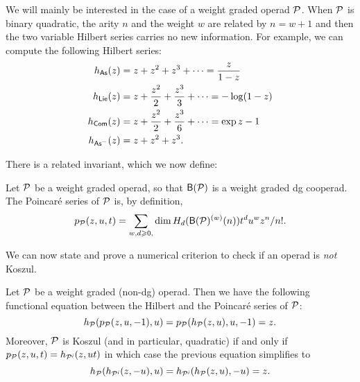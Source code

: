 We will mainly be interested in the case of a weight graded operad ${\mathcal{P}}$.
When ${\mathcal{P}}$ is binary quadratic, the arity $n$ and the weight $w$ are related
by $n = w+1$ and then the two variable Hilbert series carries no new information.
For example, we can compute the following Hilbert series:
\begin{align*}
h_{\mathsf{As}}(z) &=  z + z^2 + z^3 + \cdots = \frac{z}{1-z} \\
h_{\mathsf{Lie}}(z) &=  z + \frac {z^2}2 + \frac{z^3} 3 + \cdots =-\log(1-z) \\
h_{\mathsf{Com}}(z) &=  z + \frac {z^2}2 + \frac{z^3} 6  + \cdots = \exp z -1 \\
h_{\mathsf{As}^-}(z) &=  z +  {z^2} + z^3.
\end{align*}


There is a related invariant, which we now define:
\begin{definition} Let ${\mathcal{P}}$ be a weight graded operad, so that
$\mathsf{B}({\mathcal{P}})$ is a weight graded dg cooperad. The Poincar\'e series
of ${\mathcal{P}}$ is, by definition,
\[
p_{{\mathcal{P}}}(z,u,t) = \sum_{w,d\geqslant 0,} \dim H_d(\mathsf{B}({\mathcal{P}})^{(w)}(n)) t^d u^w z^n/n!.
\]
\end{definition}

We can now state and prove a numerical criterion to check if an
operad is \emph{not} Koszul.

\begin{theorem}
Let ${\mathcal{P}}$ be a weight graded (non-dg) operad. Then we have the following
functional equation between the Hilbert and the Poincar\'e series of ${\mathcal{P}}$:
\[
h_{\mathcal{P}}( p_{\mathcal{P}}(z,u,-1),u) = p_{\mathcal{P}}(h_{\mathcal{P}}(z,u),u,-1) = z. \]
Moreover, ${\mathcal{P}}$ is Koszul (and in particular, quadratic) if and only
if $p_\PP(z,u,t) = h_{\PP^\eantishriek}(z,ut)$ in which case the previous
equation simplifies to
\[
h_\PP( h_{\PP^\eantishriek}(z,-u),u) = h_{\PP^\eantishriek}(h_\PP(z,u),-u) = z. 
\]
\end{theorem}

